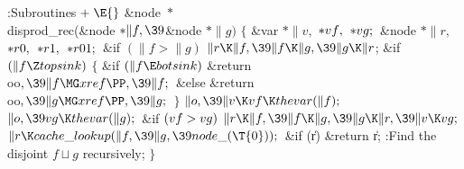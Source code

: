 \Y\B\4:Subroutines\X${}\mathrel+\E{}$\6
\&{node} ${}{*}{}$\\{disprod\_rec}(\&{node} ${}{*}\|f,\39{}$\&{node} ${}{*}%
\|g){}$\1\1\2\2\6
${}\{{}$\1\6
\&{var} ${}{*}\|v,{}$ ${}{*}\\{vf},{}$ ${}{*}\\{vg};{}$\6
\&{node} ${}{*}\|r,{}$ ${}{*}\\{r0},{}$ ${}{*}\\{r1},{}$ ${}{*}\\{r01};{}$\7
\&{if} ${}(\|f>\|g){}$\1\5
${}\|r\K\|f,\39\|f\K\|g,\39\|g\K\|r{}$;\2\6
\&{if} ${}(\|f\Z\\{topsink}){}$\5
${}\{{}$\1\6
\&{if} ${}(\|f\E\\{botsink}){}$\1\5
\&{return} \\{oo}${},\39\|f\MG\\{xref}\PP,\39\|f;{}$\2\6
\&{else}\1\5
\&{return} \\{oo}${},\39\|g\MG\\{xref}\PP,\39\|g;{}$\2\6
\4${}\}{}$\2\6
${}\|o,\39\|v\K\\{vf}\K\\{thevar}(\|f);{}$\6
${}\|o,\39\\{vg}\K\\{thevar}(\|g);{}$\6
\&{if} ${}(\\{vf}>\\{vg}){}$\1\5
${}\|r\K\|f,\39\|f\K\|g,\39\|g\K\|r,\39\|v\K\\{vg};{}$\2\6
${}\|r\K\\{cache\_lookup}(\|f,\39\|g,\39\\{node\_}(\T{0}));{}$\6
\&{if} (\|r)\1\5
\&{return} \|r;\2\6
:Find the disjoint $f\sqcup g$ recursively\X;\6
\4${}\}{}$\2\par
\fi

